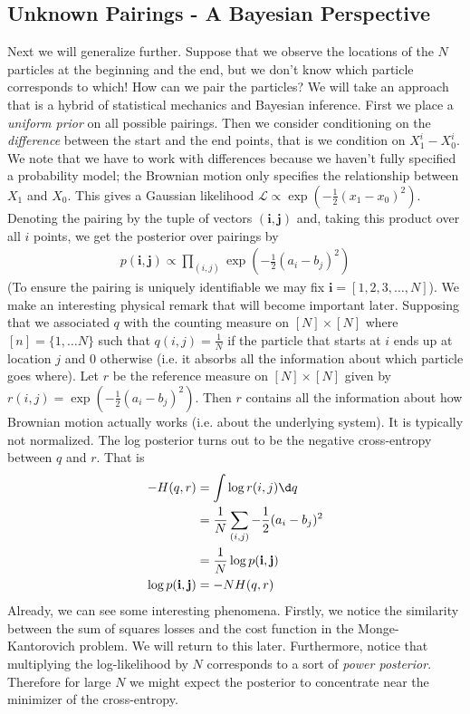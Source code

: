 \documentclass{article}
\begin{document}
\subsection{Unknown Pairings - A Bayesian Perspective}
\label{sec:unknown}
Next we will generalize further. Suppose that we observe the locations of the
$N$ particles at the beginning and the end, but we don't know which particle
corresponds to which! How can we pair the particles? We will take an approach
that is a hybrid of statistical mechanics and Bayesian inference. First we place
a \emph{uniform prior} on all possible pairings. Then we consider conditioning
on the \emph{difference} between the start and the end points, that is we 
condition on $X^i_1 - X^i_0$. We note that we have to work with differences
because we haven't fully specified a probability model; the Brownian motion only
specifies the relationship between $X_1$ and $X_0$. This gives a Gaussian
likelihood $\mathcal L \propto \exp\left(-\frac 1 2(x_1-x_0)^2\right)$. Denoting
the pairing by the tuple of vectors $(\mathbf i, \mathbf j)$ and, 
taking this product over all $i$ points, we get the posterior over pairings by
\begin{align}
    p(\mathbf i,\mathbf j) \propto \prod_{(i,j)} \exp\left(-\frac 1 2(a_i-b_j)^2\right)
\end{align}
(To ensure the pairing is uniquely identifiable we may fix $\mathbf i = [1, 2,
3, \ldots, N]$). We make an interesting physical remark that will become
important later. Supposing that we associated $q$ with the counting measure on
$[N] \times [N]$ where $[n] = \{1, \ldots N\}$ such that $q(i,j)=\frac 1 N$ if
the particle that starts at $i$ ends up at location $j$ and $0$ otherwise (i.e.
it absorbs all the information about which particle goes where). Let
$r$ be the reference measure on $[N] \times [N]$ given by
$r(i,j) = \exp\left(-\frac 1 2(a_i-b_j)^2\right)$. Then $r$ contains all the
information about how Brownian motion actually works (i.e. about the underlying
system). It is typically not normalized. The log posterior turns out to be the
negative cross-entropy between $q$ and $r$. That is
\begin{align}
    -H(q,r) &= \int \log r(i,j) \d q \\
    &= \frac 1 N \sum_{(i,j)} -\frac 1 2 (a_i - b_j)^2 \\
    &= \frac 1 N \log p(\mathbf i, \mathbf j) \\
    \log p(\mathbf i, \mathbf j) &= -NH(q,r)
\end{align}
Already, we can see some interesting phenomena. Firstly, we notice the
similarity between the sum of squares losses and the cost function in the
Monge-Kantorovich problem. We will return to this later. Furthermore, notice
that multiplying the log-likelihood by $N$ corresponds to a sort of \emph{power
posterior}. Therefore for large $N$ we might expect the posterior to concentrate
near the minimizer of the cross-entropy.
\end{document}
